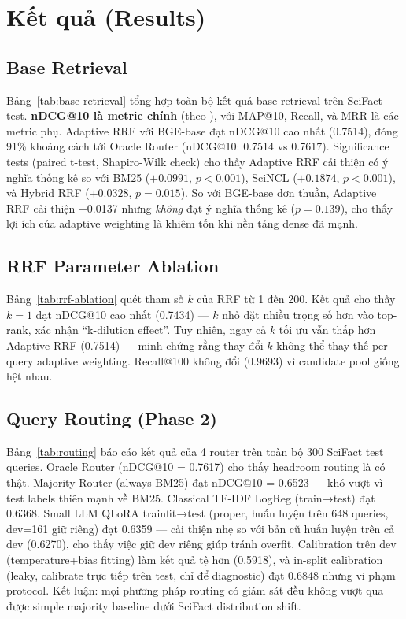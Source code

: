 \section{Kết quả (Results)}
\label{sec:results}

\subsection{Base Retrieval}
\label{sec:results:base}

Bảng~\ref{tab:base-retrieval} tổng hợp toàn bộ kết quả base retrieval trên SciFact test. \textbf{nDCG@10
là metric chính} (theo \cite{aljoofi2025scifact}), với MAP@10, Recall, và MRR là các metric phụ.
Adaptive RRF với BGE-base đạt nDCG@10 cao nhất (0.7514), đóng 91\% khoảng cách tới Oracle Router
(nDCG@10: 0.7514 vs 0.7617). Significance tests (paired t-test, Shapiro-Wilk check) cho thấy
Adaptive RRF cải thiện có ý nghĩa thống kê so với BM25 ($+0.0991$, $p<0.001$), SciNCL ($+0.1874$,
$p<0.001$), và Hybrid RRF ($+0.0328$, $p=0.015$). So với BGE-base đơn thuần, Adaptive RRF cải thiện
+0.0137 nhưng \emph{không} đạt ý nghĩa thống kê ($p=0.139$), cho thấy lợi ích của adaptive weighting
là khiêm tốn khi nền tảng dense đã mạnh.



\subsection{RRF Parameter Ablation}
\label{sec:results:rrf}

Bảng~\ref{tab:rrf-ablation} quét tham số $k$ của RRF từ 1 đến 200. Kết quả cho thấy $k=1$ đạt nDCG@10
cao nhất (0.7434) --- $k$ nhỏ đặt nhiều trọng số hơn vào top-rank, xác nhận ``k-dilution effect''.
Tuy nhiên, ngay cả $k$ tối ưu vẫn thấp hơn Adaptive RRF (0.7514) --- minh chứng rằng thay đổi $k$
không thể thay thế per-query adaptive weighting. Recall@100 không đổi (0.9693) vì candidate pool
giống hệt nhau.



\subsection{Query Routing (Phase 2)}
\label{sec:results:routing}

Bảng~\ref{tab:routing} báo cáo kết quả của 4 router trên toàn bộ 300 SciFact test queries.
Oracle Router (nDCG@10 = 0.7617) cho thấy headroom routing là có thật. Majority Router (always BM25)
đạt nDCG@10 = 0.6523 --- khó vượt vì test labels thiên mạnh về BM25. Classical TF-IDF LogReg
(train→test) đạt 0.6368. Small LLM QLoRA trainfit→test (proper, huấn luyện trên 648 queries, dev=161
giữ riêng) đạt 0.6359 --- cải thiện nhẹ so với bản cũ huấn luyện trên cả dev (0.6270), cho thấy việc
giữ dev riêng giúp tránh overfit. Calibration trên dev (temperature+bias fitting) làm kết quả tệ hơn
(0.5918), và in-split calibration (leaky, calibrate trực tiếp trên test, chỉ để diagnostic) đạt 0.6848
nhưng vi phạm protocol. Kết luận: mọi phương pháp routing có giám sát đều không vượt qua được simple
majority baseline dưới SciFact distribution shift.

